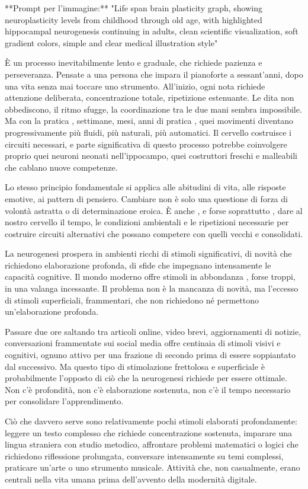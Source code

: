 **Prompt per l'immagine:** "Life span brain plasticity graph, showing neuroplasticity levels from childhood through old age, with highlighted hippocampal neurogenesis continuing in adults, clean scientific visualization, soft gradient colors, simple and clear medical illustration style"

È un processo inevitabilmente lento e graduale, che richiede pazienza e perseveranza. Pensate a una persona che impara il pianoforte a sessant'anni, dopo una vita senza mai toccare uno strumento. All'inizio, ogni nota richiede attenzione deliberata, concentrazione totale, ripetizione estenuante. Le dita non obbediscono, il ritmo sfugge, la coordinazione tra le due mani sembra impossibile. Ma con la pratica , settimane, mesi, anni di pratica , quei movimenti diventano progressivamente più fluidi, più naturali, più automatici. Il cervello costruisce i circuiti necessari, e parte significativa di questo processo potrebbe coinvolgere proprio quei neuroni neonati nell'ippocampo, quei costruttori freschi e malleabili che cablano nuove competenze.

Lo stesso principio fondamentale si applica alle abitudini di vita, alle risposte emotive, ai pattern di pensiero. Cambiare non è solo una questione di forza di volontà astratta o di determinazione eroica. È anche , e forse soprattutto , dare al nostro cervello il tempo, le condizioni ambientali e le ripetizioni necessarie per costruire circuiti alternativi che possano competere con quelli vecchi e consolidati.

La neurogenesi prospera in ambienti ricchi di stimoli significativi, di novità che richiedono elaborazione profonda, di sfide che impegnano intensamente le capacità cognitive. Il mondo moderno offre stimoli in abbondanza , forse troppi, in una valanga incessante. Il problema non è la mancanza di novità, ma l'eccesso di stimoli superficiali, frammentari, che non richiedono né permettono un'elaborazione profonda.

Passare due ore saltando tra articoli online, video brevi, aggiornamenti di notizie, conversazioni frammentate sui social media offre centinaia di stimoli visivi e cognitivi, ognuno attivo per una frazione di secondo prima di essere soppiantato dal successivo. Ma questo tipo di stimolazione frettolosa e superficiale è probabilmente l'opposto di ciò che la neurogenesi richiede per essere ottimale. Non c'è profondità, non c'è elaborazione sostenuta, non c'è il tempo necessario per consolidare l'apprendimento.

Ciò che davvero serve sono relativamente pochi stimoli elaborati profondamente: leggere un testo complesso che richiede concentrazione sostenuta, imparare una lingua straniera con studio metodico, affrontare problemi matematici o logici che richiedono riflessione prolungata, conversare intensamente su temi complessi, praticare un'arte o uno strumento musicale. Attività che, non casualmente, erano centrali nella vita umana prima dell'avvento della modernità digitale.

